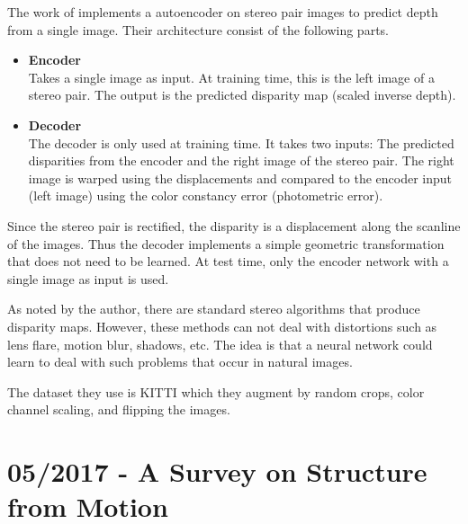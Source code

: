         The work of \citet{garg2016} implements a autoencoder on stereo pair images to predict depth from a single image.
        Their architecture consist of the following parts.
        \begin{itemize}
        	\item \textbf{Encoder}
        		\\
        		Takes a single image as input. 
        		At training time, this is the left image of a stereo pair.
        		The output is the predicted disparity map (scaled inverse depth).
        	\item \textbf{Decoder}
        		\\
        		The decoder is only used at training time.
        		It takes two inputs: The predicted disparities from the encoder and the right image of the stereo pair.
        		The right image is warped using the displacements and compared to the encoder input (left image) using the color constancy error (photometric error).
        \end{itemize}
        Since the stereo pair is rectified, the disparity is a displacement along the scanline of the images.
        Thus the decoder implements a simple geometric transformation that does not need to be learned.
        At test time, only the encoder network with a single image as input is used.
        
        As noted by the author, there are standard stereo algorithms that produce disparity maps.
        However, these methods can not deal with distortions such as lens flare, motion blur, shadows, etc.
        The idea is that a neural network could learn to deal with such problems that occur in natural images.
        
        The dataset they use is {KITTI} which they augment by random crops, color channel scaling, and flipping the images.
        
        \section{05/2017 - A Survey on Structure from Motion}
        
        	\citet{survey2017}
        
        
        
        